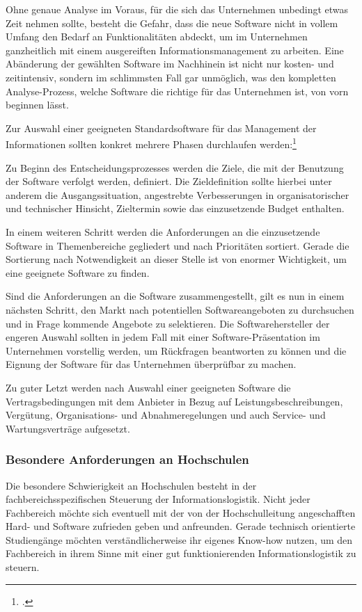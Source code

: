 Ohne genaue Analyse im Voraus, für die sich das Unternehmen unbedingt etwas Zeit nehmen sollte, 
besteht die Gefahr, dass die neue Software nicht in vollem Umfang den Bedarf an Funktionalitäten 
abdeckt, um im Unternehmen ganzheitlich mit einem ausgereiften Informationsmanagement zu arbeiten. 
Eine Abänderung der gewählten Software im Nachhinein ist nicht nur kosten- und zeitintensiv, sondern 
im schlimmsten Fall gar unmöglich, was den kompletten Analyse-Prozess, welche Software die 
richtige für das Unternehmen ist, von vorn beginnen lässt.

Zur Auswahl einer geeigneten Standardsoftware für das Management der Informationen sollten konkret 
mehrere Phasen durchlaufen werden:\footcite{gronau_auswahl_2001}

Zu Beginn des Entscheidungsprozesses werden die Ziele, die mit der Benutzung der Software verfolgt werden, 
definiert. Die Zieldefinition sollte hierbei unter anderem die Ausgangssituation, angestrebte Verbesserungen 
in organisatorischer und technischer Hinsicht, Zieltermin sowie das einzusetzende Budget enthalten.

In einem weiteren Schritt werden die Anforderungen an die einzusetzende Software in Themenbereiche 
gegliedert und nach Prioritäten sortiert. Gerade die Sortierung nach Notwendigkeit an dieser Stelle ist 
von enormer Wichtigkeit, um eine geeignete Software zu finden.

Sind die Anforderungen an die Software zusammengestellt, gilt es nun in einem nächsten Schritt, 
den Markt nach potentiellen Softwareangeboten zu durchsuchen und in Frage kommende Angebote 
zu selektieren. Die Softwarehersteller der engeren Auswahl sollten in jedem Fall mit einer 
Software-Präsentation im Unternehmen vorstellig werden, um Rückfragen beantworten zu können 
und die Eignung der Software für das Unternehmen überprüfbar zu machen.

Zu guter Letzt werden nach Auswahl einer geeigneten Software die Vertragsbedingungen mit dem 
Anbieter in Bezug auf Leistungsbeschreibungen, Vergütung, Organisations- und Abnahmeregelungen 
und auch Service- und Wartungsverträge aufgesetzt. 

\subsubsection{Besondere Anforderungen an Hochschulen}
Die besondere Schwierigkeit an Hochschulen besteht in der fachbereichsspezifischen Steuerung der 
Informationslogistik. Nicht jeder Fachbereich möchte sich eventuell mit der von der Hochschulleitung 
angeschafften Hard- und Software zufrieden geben und anfreunden. Gerade technisch orientierte 
Studiengänge möchten verständlicherweise ihr eigenes Know-how nutzen, um den Fachbereich 
in ihrem Sinne mit einer gut funktionierenden Informationslogistik zu steuern.

